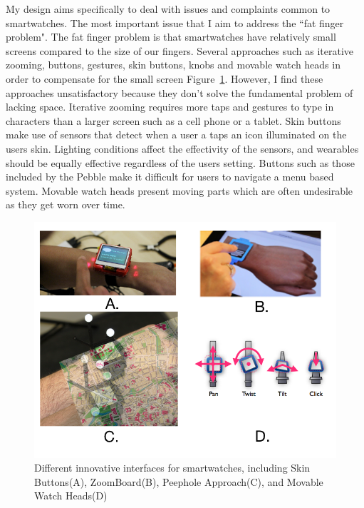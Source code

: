 \documentclass[11pt]{article}
\begin{document}
My design aims specifically to deal with issues and complaints common to smartwatches. The most important issue that I aim to address the ``fat finger problem". The fat finger problem is that smartwatches have relatively small screens compared to the size of our fingers. Several approaches such as iterative zooming, buttons, gestures, skin buttons, knobs and movable watch heads in order to compensate for the small screen Figure~\ref{fig:wearableApproaches}. However, I find these approaches unsatisfactory because they don't solve the fundamental problem of lacking space. Iterative zooming requires more taps and gestures to type in characters than a larger screen such as a cell phone or a tablet. Skin buttons make use of sensors that detect when a user a taps an icon illuminated on the users skin. Lighting conditions affect the effectivity of the sensors, and wearables should be equally effective regardless of the users setting. Buttons such as those included by the Pebble make it difficult for users to navigate a menu based system. Movable watch heads present moving parts which are often undesirable as they get worn over time.

\begin{figure}[H] %
   \centering
   \includegraphics[width=5in]{wearableApproaches.png}       
   \caption{Different innovative interfaces for smartwatches, including Skin Buttons(A), ZoomBoard(B), Peephole Approach(C), and Movable Watch Heads(D)\cite{ZoomBoard,PeepholeWatch,tiltTwistSmartWatch, Skinbuttons}}
   \label{fig:wearableApproaches}
\end{figure}  
\end{document}
